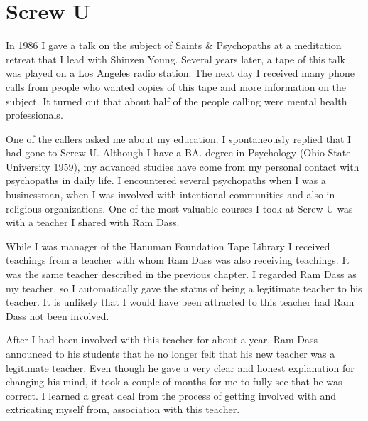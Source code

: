 \documentclass[a5paper,10pt,english]{book}
\begin{document}
\egroup


\section{Screw U}
\label{\detokenize{psychopaths:screw-u}}
\sphinxAtStartPar
In 1986 I gave a talk on the subject of Saints \& Psychopaths at a
meditation retreat that I lead with Shinzen Young. Several years later,
a tape of this talk was played on a Los Angeles radio station. The next
day I received many phone calls from people who wanted copies of this
tape and more information on the subject. It turned out that about half
of the people calling were mental health professionals.

\sphinxAtStartPar
One of the callers asked me about my education. I spontaneously replied
that I had gone to Screw U. Although I have a BA. degree in Psychology
(Ohio State University 1959), my advanced studies have come from my
personal contact with psychopaths in daily life. I encountered several
psychopaths when I was a businessman, when I was involved with
intentional communities and also in religious organizations. One of the
most valuable courses I took at Screw U was with a teacher I shared with
Ram Dass.

\sphinxAtStartPar
While I was manager of the Hanuman Foundation Tape Library I received
teachings from a teacher with whom Ram Dass was also receiving
teachings. It was the same teacher described in the previous chapter. I
regarded Ram Dass as my teacher, so I automatically gave the status of
being a legitimate teacher to his teacher. It is unlikely that I would
have been attracted to this teacher had Ram Dass not been involved.

\sphinxAtStartPar
After I had been involved with this teacher for about a year, Ram Dass
announced to his students that he no longer felt that his new teacher
was a legitimate teacher. Even though he gave a very clear and honest
explanation for changing his mind, it took a couple of months for me to
fully see that he was correct. I learned a great deal from the process
of getting involved with and extricating myself from, association with
this teacher.
\end{document}
